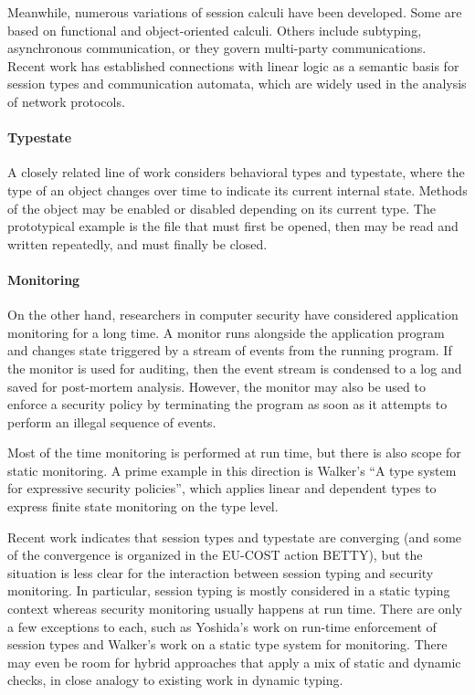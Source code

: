 \documentclass[11pt]{article}
\begin{document}
Meanwhile, numerous variations of session calculi have been developed. Some are based on functional and object-oriented calculi. Others include subtyping, asynchronous communication, or they govern multi-party communications. Recent work has established connections with linear logic as a semantic basis for session types and communication automata, which are widely used in the analysis of network protocols.

\paragraph{Typestate}

A closely related line of work considers behavioral types and typestate, where the type of an object changes over time to indicate its current internal state. Methods of the object may be enabled or disabled depending on its current type. The prototypical example is the file that must first be opened, then may be read and written repeatedly, and must finally be closed.

\paragraph{Monitoring}

On the other hand, researchers in computer security have considered application monitoring for a long time. A monitor runs alongside the application program and changes state triggered by a stream of events from the running program. If the monitor is used for auditing, then the event stream is condensed to a log and saved for post-mortem analysis. However, the monitor may also be used to enforce a security policy by terminating the program as soon as it attempts to perform an illegal sequence of events.

Most of the time monitoring is performed at run time, but there is also scope for static monitoring. A prime example in this direction is Walker’s “A type system for expressive security policies”, which applies linear and dependent types to express finite state monitoring on the type level.


Recent work indicates that session types and typestate are converging (and some of the convergence is organized in the EU-COST action BETTY), but the situation is less clear for the interaction between session typing and security monitoring. In particular, session typing is mostly considered in a static typing context whereas security monitoring usually happens at run time.
There are only a few exceptions to each, such as Yoshida’s work on run-time enforcement of session types and Walker’s work on a static type system for monitoring. There may even be room for hybrid approaches that apply a mix of static and dynamic checks, in close analogy to existing work in dynamic typing.
\end{document}
